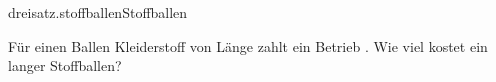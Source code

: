 \begin{exercise}{dreisatz.stoffballen}{Stoffballen}
  \ifproblem\problem\par
    Für einen Ballen Kleiderstoff von  Länge zahlt ein Betrieb
    . Wie viel kostet ein  langer Stoffballen?
  \fi
\end{exercise}
